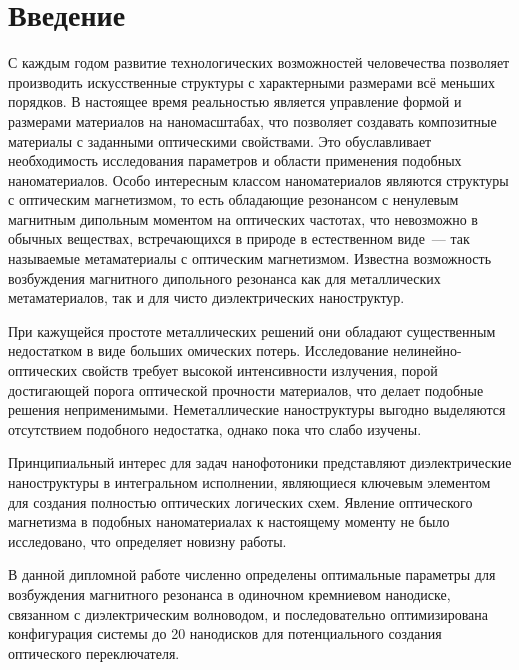 \chapter{Введение}

С каждым годом развитие технологических возможностей человечества позволяет производить искусственные структуры с характерными размерами всё меньших порядков. В настоящее время реальностью является управление формой и размерами материалов на наномасштабах, что позволяет создавать композитные материалы с заданными оптическими свойствами. Это обуславливает необходимость исследования параметров и области применения подобных наноматериалов. Особо интересным классом наноматериалов являются структуры с оптическим магнетизмом, то есть обладающие резонансом с ненулевым магнитным дипольным моментом на оптических частотах, что невозможно в обычных веществах, встречающихся в природе в естественном виде~--- так называемые метаматериалы с оптическим магнетизмом. Известна возможность возбуждения магнитного дипольного резонанса как для металлических метаматериалов, так и для чисто диэлектрических наноструктур.

При кажущейся простоте металлических решений они обладают существенным недостатком в виде больших омических потерь. Исследование нелинейно-оптических свойств требует высокой интенсивности излучения, порой достигающей порога оптической прочности материалов, что делает подобные решения неприменимыми. Неметаллические наноструктуры выгодно выделяются отсутствием подобного недостатка, однако пока что слабо изучены. 

Принципиальный интерес для задач нанофотоники представляют диэлектрические наноструктуры в интегральном исполнении, являющиеся ключевым элементом для создания полностью оптических логических схем. Явление оптического магнетизма в подобных наноматериалах к настоящему моменту не было исследовано, что определяет новизну работы.

В данной дипломной работе численно определены оптимальные параметры для возбуждения магнитного резонанса в одиночном кремниевом нанодиске, связанном с диэлектрическим волноводом, и последовательно оптимизирована конфигурация системы до 20 нанодисков для потенциального создания оптического переключателя.